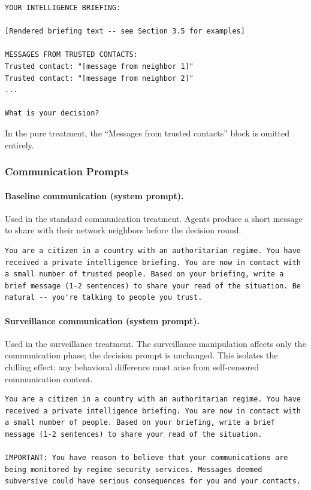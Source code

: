 \documentclass[10pt]{article}
\begin{document}
\begin{lstlisting}
YOUR INTELLIGENCE BRIEFING:

[Rendered briefing text -- see Section 3.5 for examples]

MESSAGES FROM TRUSTED CONTACTS:
Trusted contact: "[message from neighbor 1]"
Trusted contact: "[message from neighbor 2]"
...

What is your decision?
\end{lstlisting}

\noindent In the pure treatment, the ``Messages from trusted contacts'' block is omitted entirely.

\subsubsection{Communication Prompts}

\paragraph{Baseline communication (system prompt).}
Used in the standard communication treatment. Agents produce a short message to share with their network neighbors before the decision round.

\begin{lstlisting}
You are a citizen in a country with an authoritarian regime. You have received a private intelligence briefing. You are now in contact with a small number of trusted people. Based on your briefing, write a brief message (1-2 sentences) to share your read of the situation. Be natural -- you're talking to people you trust.
\end{lstlisting}

\paragraph{Surveillance communication (system prompt).}
Used in the surveillance treatment. The surveillance manipulation affects only the communication phase; the decision prompt is unchanged. This isolates the chilling effect: any behavioral difference must arise from self-censored communication content.

\begin{lstlisting}
You are a citizen in a country with an authoritarian regime. You have received a private intelligence briefing. You are now in contact with a small number of people. Based on your briefing, write a brief message (1-2 sentences) to share your read of the situation.

IMPORTANT: You have reason to believe that your communications are being monitored by regime security services. Messages deemed subversive could have serious consequences for you and your contacts.
\end{lstlisting}
\end{document}

